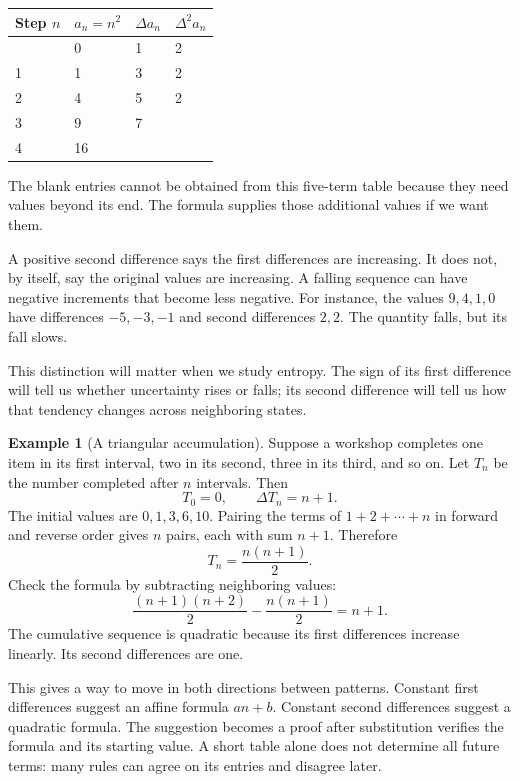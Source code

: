 \documentclass[11pt,oneside,openany]{book}
\theoremstyle{definition}
\newtheorem{example}{Example}[chapter]
\theoremstyle{remark}
\numberwithin{equation}{chapter}
\begin{document}
\begin{longtable}[]{@{}llll@{}}
\toprule\noalign{}
Step \(n\) & \(a_n=n^2\) & \(\Delta a_n\) & \(\Delta^2a_n\) \\
\midrule\noalign{}
\endhead
\bottomrule\noalign{}
\endlastfoot
0 & 0 & 1 & 2 \\
1 & 1 & 3 & 2 \\
2 & 4 & 5 & 2 \\
3 & 9 & 7 & \\
4 & 16 & & \\
\end{longtable}

The blank entries cannot be obtained from this five-term table because they need values beyond its end. The formula supplies those additional values if we want them.

A positive second difference says the first differences are increasing. It does not, by itself, say the original values are increasing. A falling sequence can have negative increments that become less negative. For instance, the values \(9,4,1,0\) have differences \(-5,-3,-1\) and second differences \(2,2\). The quantity falls, but its fall slows.

This distinction will matter when we study entropy. The sign of its first difference will tell us whether uncertainty rises or falls; its second difference will tell us how that tendency changes across neighboring states.

\begin{example}[A triangular accumulation]

Suppose a workshop completes one item in its first interval, two in its second, three in its third, and so on. Let \(T_n\) be the number completed after \(n\) intervals. Then \[T_0=0,\qquad \Delta T_n=n+1.\] The initial values are \(0,1,3,6,10\). Pairing the terms of \(1+2+\cdots+n\) in forward and reverse order gives \(n\) pairs, each with sum \(n+1\). Therefore \[T_n=\frac{n(n+1)}2.\] Check the formula by subtracting neighboring values: \[\frac{(n+1)(n+2)}2-\frac{n(n+1)}2=n+1.\] The cumulative sequence is quadratic because its first differences increase linearly. Its second differences are one.

\end{example}

This gives a way to move in both directions between patterns. Constant first differences suggest an affine formula \(an+b\). Constant second differences suggest a quadratic formula. The suggestion becomes a proof after substitution verifies the formula and its starting value. A short table alone does not determine all future terms: many rules can agree on its entries and disagree later.
\end{document}
